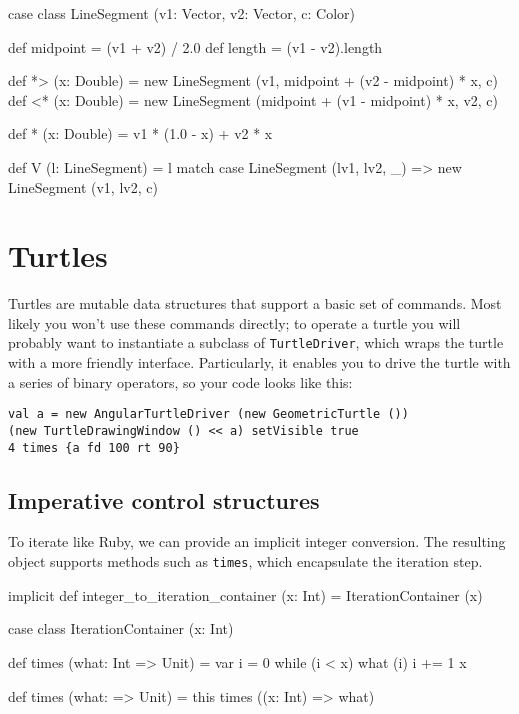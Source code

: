 \documentclass{article}
\begin{document}
      \begin{scalacode}
case class LineSegment (v1: Vector, v2: Vector, c: Color) {
  def midpoint = (v1 + v2) / 2.0
  def length   = (v1 - v2).length

  def  *> (x: Double) = new LineSegment (v1, midpoint + (v2 - midpoint) * x, c)
  def <*  (x: Double) = new LineSegment (midpoint + (v1 - midpoint) * x, v2, c)

  def * (x: Double) = v1 * (1.0 - x) + v2 * x

  def V (l: LineSegment) = l match {
    case LineSegment (lv1, lv2, _) => new LineSegment (v1, lv2, c)}
}
      \end{scalacode}

  \section{Turtles}
    \label{sec:turtles}

    Turtles are mutable data structures that support a basic set of commands. Most likely you won't use these commands directly; to operate a turtle you will
    probably want to instantiate a subclass of {\tt TurtleDriver}, which wraps the turtle with a more friendly interface. Particularly, it enables you to drive
    the turtle with a series of binary operators, so your code looks like this:

    \begin{verbatim}
val a = new AngularTurtleDriver (new GeometricTurtle ())
(new TurtleDrawingWindow () << a) setVisible true
4 times {a fd 100 rt 90}
    \end{verbatim}

    \subsection{Imperative control structures}
      \label{sec:imperative-control-structures}

      To iterate like Ruby, we can provide an implicit integer conversion. The resulting object supports methods such as {\tt times}, which encapsulate the
      iteration step.

      \begin{scalacode}
implicit def integer_to_iteration_container (x: Int) = IterationContainer (x)

case class IterationContainer (x: Int) {
  def times (what: Int => Unit) = {
    var i = 0
    while (i < x) {
      what (i)
      i += 1
    }
    x
  }

  def times (what: => Unit) = this times ((x: Int) => what)
}
      \end{scalacode}
\end{document}
